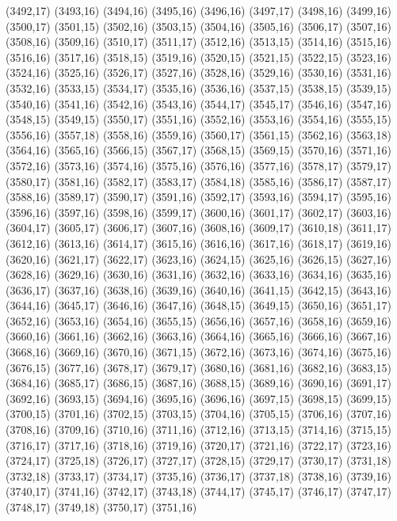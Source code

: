 (3492,17)
(3493,16)
(3494,16)
(3495,16)
(3496,16)
(3497,17)
(3498,16)
(3499,16)
(3500,17)
(3501,15)
(3502,16)
(3503,15)
(3504,16)
(3505,16)
(3506,17)
(3507,16)
(3508,16)
(3509,16)
(3510,17)
(3511,17)
(3512,16)
(3513,15)
(3514,16)
(3515,16)
(3516,16)
(3517,16)
(3518,15)
(3519,16)
(3520,15)
(3521,15)
(3522,15)
(3523,16)
(3524,16)
(3525,16)
(3526,17)
(3527,16)
(3528,16)
(3529,16)
(3530,16)
(3531,16)
(3532,16)
(3533,15)
(3534,17)
(3535,16)
(3536,16)
(3537,15)
(3538,15)
(3539,15)
(3540,16)
(3541,16)
(3542,16)
(3543,16)
(3544,17)
(3545,17)
(3546,16)
(3547,16)
(3548,15)
(3549,15)
(3550,17)
(3551,16)
(3552,16)
(3553,16)
(3554,16)
(3555,15)
(3556,16)
(3557,18)
(3558,16)
(3559,16)
(3560,17)
(3561,15)
(3562,16)
(3563,18)
(3564,16)
(3565,16)
(3566,15)
(3567,17)
(3568,15)
(3569,15)
(3570,16)
(3571,16)
(3572,16)
(3573,16)
(3574,16)
(3575,16)
(3576,16)
(3577,16)
(3578,17)
(3579,17)
(3580,17)
(3581,16)
(3582,17)
(3583,17)
(3584,18)
(3585,16)
(3586,17)
(3587,17)
(3588,16)
(3589,17)
(3590,17)
(3591,16)
(3592,17)
(3593,16)
(3594,17)
(3595,16)
(3596,16)
(3597,16)
(3598,16)
(3599,17)
(3600,16)
(3601,17)
(3602,17)
(3603,16)
(3604,17)
(3605,17)
(3606,17)
(3607,16)
(3608,16)
(3609,17)
(3610,18)
(3611,17)
(3612,16)
(3613,16)
(3614,17)
(3615,16)
(3616,16)
(3617,16)
(3618,17)
(3619,16)
(3620,16)
(3621,17)
(3622,17)
(3623,16)
(3624,15)
(3625,16)
(3626,15)
(3627,16)
(3628,16)
(3629,16)
(3630,16)
(3631,16)
(3632,16)
(3633,16)
(3634,16)
(3635,16)
(3636,17)
(3637,16)
(3638,16)
(3639,16)
(3640,16)
(3641,15)
(3642,15)
(3643,16)
(3644,16)
(3645,17)
(3646,16)
(3647,16)
(3648,15)
(3649,15)
(3650,16)
(3651,17)
(3652,16)
(3653,16)
(3654,16)
(3655,15)
(3656,16)
(3657,16)
(3658,16)
(3659,16)
(3660,16)
(3661,16)
(3662,16)
(3663,16)
(3664,16)
(3665,16)
(3666,16)
(3667,16)
(3668,16)
(3669,16)
(3670,16)
(3671,15)
(3672,16)
(3673,16)
(3674,16)
(3675,16)
(3676,15)
(3677,16)
(3678,17)
(3679,17)
(3680,16)
(3681,16)
(3682,16)
(3683,15)
(3684,16)
(3685,17)
(3686,15)
(3687,16)
(3688,15)
(3689,16)
(3690,16)
(3691,17)
(3692,16)
(3693,15)
(3694,16)
(3695,16)
(3696,16)
(3697,15)
(3698,15)
(3699,15)
(3700,15)
(3701,16)
(3702,15)
(3703,15)
(3704,16)
(3705,15)
(3706,16)
(3707,16)
(3708,16)
(3709,16)
(3710,16)
(3711,16)
(3712,16)
(3713,15)
(3714,16)
(3715,15)
(3716,17)
(3717,16)
(3718,16)
(3719,16)
(3720,17)
(3721,16)
(3722,17)
(3723,16)
(3724,17)
(3725,18)
(3726,17)
(3727,17)
(3728,15)
(3729,17)
(3730,17)
(3731,18)
(3732,18)
(3733,17)
(3734,17)
(3735,16)
(3736,17)
(3737,18)
(3738,16)
(3739,16)
(3740,17)
(3741,16)
(3742,17)
(3743,18)
(3744,17)
(3745,17)
(3746,17)
(3747,17)
(3748,17)
(3749,18)
(3750,17)
(3751,16)
